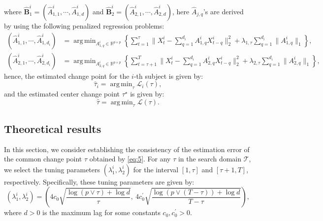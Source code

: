 \documentclass[11pt]{article}
\DeclareMathOperator*{\argmin}{arg\,min}
\begin{document}
where $\widehat{\mathbf{B}}_1^i = (\widehat{A}_{1,1}^i, \cdots, \widehat{A}_{1,d}^i)$ and $\widehat{\mathbf{B}}_2^i = (\widehat{A}_{2,1}^i, \cdots, \widehat{A}_{2,d}^i)$, here $\widehat{A}_{j,q}$'s are derived by using the following penalized regression problems:
\begin{equation*}
    \begin{aligned}
        (\widehat{A}_{1,1}^i, \cdots, \widehat{A}_{1,d_i}^i) &= \argmin_{A_{1,q}^i \in \mathbb{R}^{p\times p}}\left\{ \sum_{t=1}^\tau\|X_t^i - \sum_{q=1}^{d_i}A_{1,q}^iX_{t-q}^i\|_2^2 + \lambda_{1,\tau}\sum_{q=1}^{d_i}\|A_{1,q}^i\|_1 \right\}, \\
        (\widehat{A}_{2,1}^i, \cdots, \widehat{A}_{2,d_i}^i) &= \argmin_{A_{2,q}^i \in \mathbb{R}^{p\times p}}\left\{ \sum_{t=\tau+1}^T\|X_t^i - \sum_{q=1}^{d_i}A_{2,q}^iX_{t-q}^i\|_2^2 + \lambda_{2,\tau}\sum_{q=1}^{d_i}\|A_{2,q}^i\|_1 \right\},
    \end{aligned}
\end{equation*}
hence, the estimated change point for the $i$-th subject is given by:
\begin{equation*}
    \widehat{\tau}_i = \argmin_\tau\mathcal{L}_i(\tau),
\end{equation*}
and the estimated center change point $\tau^\star$ is given by:
\begin{equation*}
    \widehat{\tau} = \argmin_\tau \mathcal{L}(\tau).
\end{equation*}


\subsection{Theoretical results}
\label{sec:singlecp-theory}
In this section, we consider establishing the consistency of the estimation error of the common change point $\widehat{\tau}$ obtained by \eqref{eq:5}. For any $\tau$ in the search domain $\mathcal{T}$, we select the tuning parameters $(\lambda_1^i, \lambda_2^i)$ for the interval $[1, \tau]$ and $[\tau+1, T]$, respectively. Specifically, these tuning parameters are given by:
\begin{equation*}
    (\lambda_1^i, \lambda_2^i) = \left( 4c_0\sqrt{\frac{\log (p\vee \tau) + \log d}{\tau}},\  4c_0^\prime\sqrt{\frac{\log (p \vee (T-\tau)) + \log d}{T-\tau}} \right),
\end{equation*}
where $d>0$ is the maximum lag  for some constants $c_0, c_0^\prime>0$.
\end{document}
